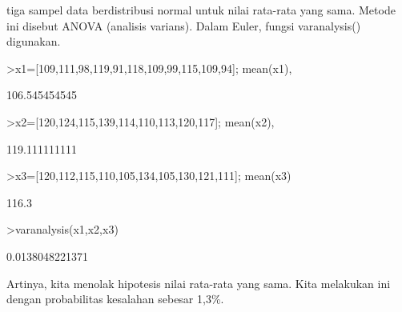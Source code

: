 \documentclass[a4paper,10pt]{article}
\begin{document}
\begin{eulernotebook}
\begin{eulercomment}
\begin{eulercomment}
\begin{eulercomment}
\begin{eulercomment}
\begin{eulercomment}
\begin{eulercomment}
\begin{eulercomment}
\begin{eulercomment}
\begin{eulercomment}
\begin{eulercomment}
\begin{eulercomment}
\begin{eulercomment}
\begin{eulercomment}
\begin{eulercomment}
\begin{eulercomment}
\begin{eulercomment}
\begin{eulercomment}
\begin{eulercomment}
\begin{eulercomment}
\begin{eulercomment}
\begin{eulercomment}
\begin{eulercomment}
\begin{eulercomment}
\begin{eulercomment}
\begin{eulercomment}
\begin{eulercomment}
\begin{eulercomment}
\begin{eulercomment}
\begin{eulercomment}
\begin{eulercomment}
\begin{eulercomment}
\begin{eulercomment}
\begin{eulercomment}
tiga sampel data berdistribusi normal untuk nilai rata-rata yang sama.
Metode ini disebut ANOVA (analisis varians). Dalam Euler, fungsi
varanalysis() digunakan.
\end{eulercomment}
\begin{eulerprompt}
>x1=[109,111,98,119,91,118,109,99,115,109,94]; mean(x1),
\end{eulerprompt}
\begin{euleroutput}
  106.545454545
\end{euleroutput}
\begin{eulerprompt}
>x2=[120,124,115,139,114,110,113,120,117]; mean(x2),
\end{eulerprompt}
\begin{euleroutput}
  119.111111111
\end{euleroutput}
\begin{eulerprompt}
>x3=[120,112,115,110,105,134,105,130,121,111]; mean(x3)
\end{eulerprompt}
\begin{euleroutput}
  116.3
\end{euleroutput}
\begin{eulerprompt}
>varanalysis(x1,x2,x3)
\end{eulerprompt}
\begin{euleroutput}
  0.0138048221371
\end{euleroutput}
\begin{eulercomment}
Artinya, kita menolak hipotesis nilai rata-rata yang sama. Kita
melakukan ini dengan probabilitas kesalahan sebesar 1,3\%.


\end{eulercomment}
\end{eulercomment}
\end{eulercomment}
\end{eulercomment}
\end{eulercomment}
\end{eulercomment}
\end{eulercomment}
\end{eulercomment}
\end{eulercomment}
\end{eulercomment}
\end{eulercomment}
\end{eulercomment}
\end{eulercomment}
\end{eulercomment}
\end{eulercomment}
\end{eulercomment}
\end{eulercomment}
\end{eulercomment}
\end{eulercomment}
\end{eulercomment}
\end{eulercomment}
\end{eulercomment}
\end{eulercomment}
\end{eulercomment}
\end{eulercomment}
\end{eulercomment}
\end{eulercomment}
\end{eulercomment}
\end{eulercomment}
\end{eulercomment}
\end{eulercomment}
\end{eulercomment}
\end{eulercomment}
\end{eulernotebook}
\end{document}
